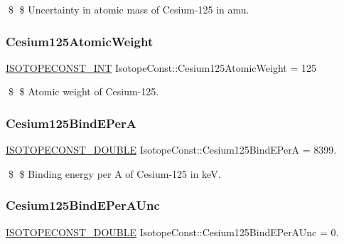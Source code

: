 \$ \$ Uncertainty in atomic mass of Cesium-\/125 in amu. \mbox{\label{group___isotope_const-_cesium-_cs125_gaac749da0aa27dc0c158bddc4cbe80c13}} 
\subsubsection{\texorpdfstring{Cesium125\+Atomic\+Weight}{Cesium125AtomicWeight}}
{\footnotesize\ttfamily \mbox{\hyperlink{group___isotope_const-_macros_ga5f18360b3e99483a35c32d789e62621c}{I\+S\+O\+T\+O\+P\+E\+C\+O\+N\+S\+T\+\_\+\+I\+NT}} Isotope\+Const\+::\+Cesium125\+Atomic\+Weight = 125}

\$ \$ Atomic weight of Cesium-\/125. \mbox{\label{group___isotope_const-_cesium-_cs125_ga03d56de63b552e8e18d5ec49fc15bbfe}} 
\subsubsection{\texorpdfstring{Cesium125\+Bind\+E\+PerA}{Cesium125BindEPerA}}
{\footnotesize\ttfamily \mbox{\hyperlink{group___isotope_const-_macros_ga8f45a7272ce02c0b4c65c44636ed719a}{I\+S\+O\+T\+O\+P\+E\+C\+O\+N\+S\+T\+\_\+\+D\+O\+U\+B\+LE}} Isotope\+Const\+::\+Cesium125\+Bind\+E\+PerA = 8399.}

\$ \$ Binding energy per A of Cesium-\/125 in keV. \mbox{\label{group___isotope_const-_cesium-_cs125_ga2564e6d6b13c17d5cc2ea52ddd5d7ca7}} 
\subsubsection{\texorpdfstring{Cesium125\+Bind\+E\+Per\+A\+Unc}{Cesium125BindEPerAUnc}}
{\footnotesize\ttfamily \mbox{\hyperlink{group___isotope_const-_macros_ga8f45a7272ce02c0b4c65c44636ed719a}{I\+S\+O\+T\+O\+P\+E\+C\+O\+N\+S\+T\+\_\+\+D\+O\+U\+B\+LE}} Isotope\+Const\+::\+Cesium125\+Bind\+E\+Per\+A\+Unc = 0.}

